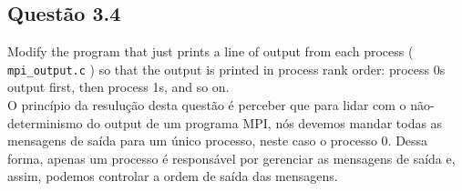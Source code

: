 

\subsection{Questão 3.4}

Modify the program that just prints a line of output from each process
( \texttt{mpi\_output.c} ) so that the output is printed in process rank order: process 0s output first, then process 1s, and so on.\\



O princípio da resulução desta questão é perceber que para lidar com o não-determinismo do output de um programa MPI, nós devemos mandar todas as mensagens de saída para um único processo, neste caso o processo 0. Dessa forma, apenas um processo é responsável por gerenciar as mensagens de saída e, assim, podemos controlar a ordem de saída das mensagens.
